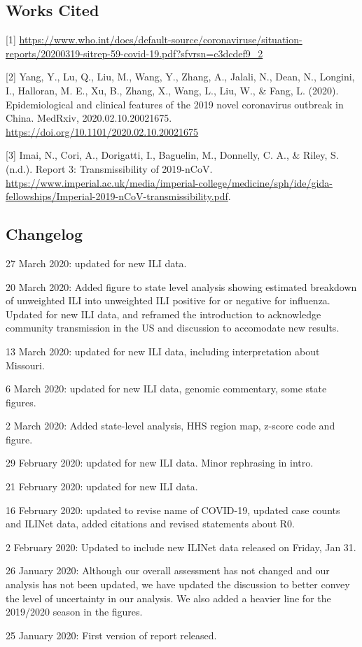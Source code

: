 \documentclass[]{article}
\begin{document}
\hypertarget{works-cited}{%
\subsection{Works Cited}\label{works-cited}}

{[}1{]}
\url{https://www.who.int/docs/default-source/coronaviruse/situation-reports/20200319-sitrep-59-covid-19.pdf?sfvrsn=c3dcdef9_2}

{[}2{]} Yang, Y., Lu, Q., Liu, M., Wang, Y., Zhang, A., Jalali, N.,
Dean, N., Longini, I., Halloran, M. E., Xu, B., Zhang, X., Wang, L.,
Liu, W., \& Fang, L. (2020). Epidemiological and clinical features of
the 2019 novel coronavirus outbreak in China. MedRxiv,
2020.02.10.20021675. \url{https://doi.org/10.1101/2020.02.10.20021675}

{[}3{]} Imai, N., Cori, A., Dorigatti, I., Baguelin, M., Donnelly, C.
A., \& Riley, S. (n.d.). Report 3: Transmissibility of 2019-nCoV.
\url{https://www.imperial.ac.uk/media/imperial-college/medicine/sph/ide/gida-fellowships/Imperial-2019-nCoV-transmissibility.pdf}.

\clearpage

\hypertarget{changelog}{%
\subsection{Changelog}\label{changelog}}

27 March 2020: updated for new ILI data.

20 March 2020: Added figure to state level analysis showing estimated
breakdown of unweighted ILI into unweighted ILI positive for or negative
for influenza. Updated for new ILI data, and reframed the introduction
to acknowledge community transmission in the US and discussion to
accomodate new results.

13 March 2020: updated for new ILI data, including interpretation about
Missouri.

6 March 2020: updated for new ILI data, genomic commentary, some state
figures.

2 March 2020: Added state-level analysis, HHS region map, z-score code
and figure.

29 February 2020: updated for new ILI data. Minor rephrasing in intro.

21 February 2020: updated for new ILI data.

16 February 2020: updated to revise name of COVID-19, updated case
counts and ILINet data, added citations and revised statements about R0.

2 February 2020: Updated to include new ILINet data released on Friday,
Jan 31.

26 January 2020: Although our overall assessment has not changed and our
analysis has not been updated, we have updated the discussion to better
convey the level of uncertainty in our analysis. We also added a heavier
line for the 2019/2020 season in the figures.

25 January 2020: First version of report released.
\end{document}
